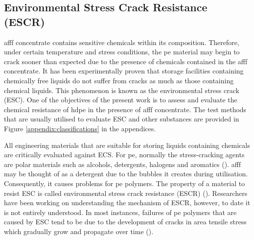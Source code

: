 \subsection{Environmental Stress Crack Resistance (ESCR)}
\acrshort{afff} concentrate contains sensitive chemicals within its composition. Therefore, under certain temperature and stress conditions, the \acrshort{pe} material may begin to crack sooner than expected due to the presence of chemicals contained in the \acrshort{afff} concentrate. It has been experimentally proven that storage facilities containing chemically free liquids do not suffer from cracks as much as those containing chemical liquids. This phenomenon is known as the environmental stress crack (ESC). One of the objectives of the present work is to assess and evaluate the chemical resistance of \acrshort{hdpe} in the presence of \acrshort{afff} concentrate. The test methods that are usually utilised to evaluate ESC and other substances are provided in Figure \ref{appendix:classifications} in the appendices. 

All engineering materials that are suitable for storing liquids containing chemicals are critically evaluated against ECS. For \acrshort{pe}, normally the stress-cracking agents are polar materials such as alcohols, detergents, halogens and aromatics (\cite{gabriel1998history}). \acrshort{afff} may be thought of as a detergent due to the bubbles it creates during utilisation. Consequently, it causes problems for \acrshort{pe} polymers. The property of a material to resist ESC is called environmental stress crack resistance (ESCR) (\cite{gabriel1998history}). Researchers have been working on understanding the mechanism of ESCR, however, to date it is not entirely understood. In most instances, failures of \acrshort{pe} polymers that are caused by ESC tend to be due to the development of cracks in area tensile stress which gradually grow and propagate over time (\cite{peacock2000handbook}).


